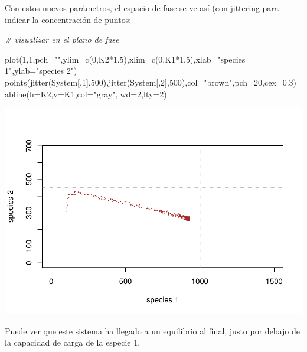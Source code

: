 \documentclass[
]{article}
\newenvironment{Shaded}{\begin{snugshade}}{\end{snugshade}}
\newcommand{\AttributeTok}[1]{\textcolor[rgb]{0.77,0.63,0.00}{#1}}
\newcommand{\CommentTok}[1]{\textcolor[rgb]{0.56,0.35,0.01}{\textit{#1}}}
\newcommand{\DecValTok}[1]{\textcolor[rgb]{0.00,0.00,0.81}{#1}}
\newcommand{\FloatTok}[1]{\textcolor[rgb]{0.00,0.00,0.81}{#1}}
\newcommand{\FunctionTok}[1]{\textcolor[rgb]{0.00,0.00,0.00}{#1}}
\newcommand{\NormalTok}[1]{#1}
\newcommand{\SpecialCharTok}[1]{\textcolor[rgb]{0.00,0.00,0.00}{#1}}
\newcommand{\StringTok}[1]{\textcolor[rgb]{0.31,0.60,0.02}{#1}}
\begin{document}
Con estos nuevos parámetros, el espacio de fase se ve así (con jittering
para indicar la concentración de puntos:

\begin{Shaded}
\begin{Highlighting}[]
\CommentTok{\# visualizar en el plano de fase}

\FunctionTok{plot}\NormalTok{(}\DecValTok{1}\NormalTok{,}\DecValTok{1}\NormalTok{,}\AttributeTok{pch=}\StringTok{""}\NormalTok{,}\AttributeTok{ylim=}\FunctionTok{c}\NormalTok{(}\DecValTok{0}\NormalTok{,K2}\SpecialCharTok{*}\FloatTok{1.5}\NormalTok{),}\AttributeTok{xlim=}\FunctionTok{c}\NormalTok{(}\DecValTok{0}\NormalTok{,K1}\SpecialCharTok{*}\FloatTok{1.5}\NormalTok{),}\AttributeTok{xlab=}\StringTok{"species 1"}\NormalTok{,}\AttributeTok{ylab=}\StringTok{"species 2"}\NormalTok{)}
\FunctionTok{points}\NormalTok{(}\FunctionTok{jitter}\NormalTok{(System[,}\DecValTok{1}\NormalTok{],}\DecValTok{500}\NormalTok{),}\FunctionTok{jitter}\NormalTok{(System[,}\DecValTok{2}\NormalTok{],}\DecValTok{500}\NormalTok{),}\AttributeTok{col=}\StringTok{"brown"}\NormalTok{,}\AttributeTok{pch=}\DecValTok{20}\NormalTok{,}\AttributeTok{cex=}\FloatTok{0.3}\NormalTok{)}
\FunctionTok{abline}\NormalTok{(}\AttributeTok{h=}\NormalTok{K2,}\AttributeTok{v=}\NormalTok{K1,}\AttributeTok{col=}\StringTok{"gray"}\NormalTok{,}\AttributeTok{lwd=}\DecValTok{2}\NormalTok{,}\AttributeTok{lty=}\DecValTok{2}\NormalTok{)}
\end{Highlighting}
\end{Shaded}

\includegraphics{LECTURE16_files/figure-latex/unnamed-chunk-7-1.pdf}

Puede ver que este sistema ha llegado a un equilibrio al final, justo
por debajo de la capacidad de carga de la especie 1.
\end{document}
